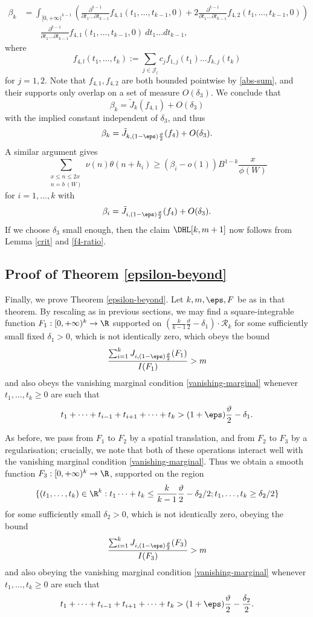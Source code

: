 \begin{align*}
\beta_k &= \int_{[0,+\infty)^{k-1}} \left(\frac{\partial^{k-1}}{\partial t_1 \dots \partial t_{k-1}} f_{4,1}(t_1,\dots,t_{k-1},0) + 2\frac{\partial^{k-1}}{\partial t_1 \dots \partial t_{k-1}} f_{4,2}(t_1,\dots,t_{k-1},0)\right)\\
&\quad\quad  \frac{\partial^{k-1}}{\partial t_1 \dots \partial t_{k-1}} f_{4,1}(t_1,\dots,t_{k-1},0)\ dt_1 \dots dt_{k-1} ,
\end{align*}
where
$$ f_{4,l}(t_1,\dots,t_k) :=\sum_{j \in {\mathcal J}_l} c_j f_{1,j}(t_1) \dots f_{k,j}(t_k)$$
for $j=1,2$.  Note that $f_{4,1}, f_{4,2}$ are both bounded pointwise by \eqref{abs-sum}, and their supports only overlap on a set of measure $O( \delta_3 )$.  We conclude that
$$ \beta_k = \tilde J_k( f_{4,1} ) + O(\delta_3)$$
with the implied constant independent of $\delta_3$, and thus
$$ \beta_k = \tilde J_{k, (1-\eps) \frac{\vartheta}{2}}( f_4 ) + O(\delta_3).$$
A similar argument gives
$$ 
 \sum_{\substack{x \leq n \leq 2x\\ n = b\ (W)}} \nu(n) \theta(n+h_i) \geq (\beta_i - o(1)) B^{1-k} \frac{x}{\phi(W)}$$
for $i=1,\dots,k$ with
$$ \beta_i = \tilde J_{i, (1-\eps) \frac{\vartheta}{2}}( f_4 ) + O(\delta_3).$$
If we choose $\delta_3$ small enough, then the claim $\DHL[k,m+1]$ now follows from Lemma \ref{crit} and \eqref{f4-ratio}.

\subsection{Proof of Theorem \ref{epsilon-beyond}}\label{beyond-sec}

Finally, we prove Theorem \ref{epsilon-beyond}. Let $k, m, \eps, F$ be as in that theorem.  By rescaling as in previous sections, we may find
a square-integrable function $F_1: [0,+\infty)^k \to \R$ supported on 
$(\frac{k}{k-1} \frac{\vartheta}{2}-\delta_1) \cdot {\mathcal R}_k$ for some sufficiently small fixed $\delta_1 > 0$, which is not identically zero, which obeys the bound
$$
\frac{\sum_{i=1}^k J_{i,(1-\eps) \frac{\vartheta}{2}}(F_1)}{I(F_1)} > m
$$
and also obeys the vanishing marginal condition \eqref{vanishing-marginal} whenever $t_1,\dots,t_k \geq 0$ are such that
$$ t_1+\dots+t_{i-1}+t_{i+1}+\dots+t_k > (1+\eps) \frac{\vartheta}{2} - \delta_1.$$

As before, we pass from $F_1$ to $F_2$ by a spatial translation, and from $F_2$ to $F_3$ by a regularisation; crucially, we note that both of these operations interact well with the vanishing marginal condition \eqref{vanishing-marginal}. Thus we obtain a smooth function $F_3: [0,+\infty)^k \to \R$, supported on the region
$$
\{ (t_1,\dots,t_k) \in \R^k: t_1 \dots + t_k \leq \frac{k}{k-1} \frac{\vartheta}{2}-\delta_2/2; t_1,\dots,t_k \geq \delta_2/2 \}$$
for some sufficiently small $\delta_2>0$, which is not identically zero, obeying the bound
$$
\frac{\sum_{i=1}^k J_{i,(1-\eps) \frac{\vartheta}{2}}(F_3)}{I(F_3)} > m
$$
and also obeying the vanishing marginal condition \eqref{vanishing-marginal} whenever
$t_1,\dots,t_k \geq 0$ are such that
$$ t_1+\dots+t_{i-1}+t_{i+1}+\dots+t_k > (1+\eps) \frac{\vartheta}{2} - \frac{\delta_2}{2}.$$

